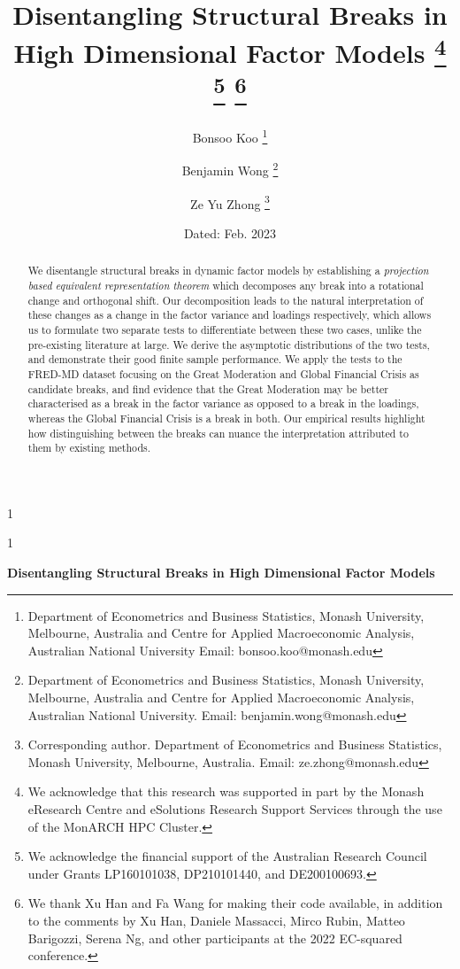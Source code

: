 \documentclass[12pt]{article}
\theoremstyle{plain}
\numberwithin{equation}{section}
\begin{document}
\newcommand{\blind}{1}

\blind
{
  \title{\bf Disentangling Structural Breaks in High Dimensional Factor Models \thanks{We acknowledge that this research was supported in part by the Monash eResearch Centre and eSolutions Research Support Services through the use of the MonARCH HPC Cluster.} \thanks{We acknowledge the financial support of the Australian Research Council under Grants LP160101038, DP210101440, and DE200100693.} \thanks{We thank Xu Han and Fa Wang for making their code available, in addition to the comments by Xu Han, Daniele Massacci, Mirco Rubin, Matteo Barigozzi, Serena Ng, and other participants at the 2022 EC-squared conference.}}
\author{Bonsoo Koo \thanks{Department of Econometrics and Business Statistics, Monash University, Melbourne, Australia and Centre for Applied Macroeconomic Analysis, Australian National University Email: bonsoo.koo@monash.edu}}
\author{Benjamin Wong \thanks{Department of Econometrics and Business Statistics, Monash University, Melbourne, Australia and Centre for Applied Macroeconomic Analysis, Australian National University. Email: benjamin.wong@monash.edu}}
\author{Ze Yu Zhong \thanks{
Corresponding author. Department of Econometrics and Business Statistics, Monash University, Melbourne, Australia. Email:
ze.zhong@monash.edu}}
  \date{Dated: Feb. 2023}
  \maketitle
} \fi

\blind
{
  \bigskip
  \bigskip
  \bigskip
  \begin{center}
    {\LARGE\bf Disentangling Structural Breaks in High Dimensional Factor Models}
\end{center}
  \medskip
} \fi

\bigskip
\begin{abstract}
We disentangle structural breaks in dynamic factor models by establishing a \emph{projection based equivalent representation theorem} which decomposes any break into a rotational change and orthogonal shift. Our decomposition leads to the natural interpretation of these changes as a change in the factor variance and loadings respectively, which allows us to formulate two separate tests to differentiate between these two cases, unlike the pre-existing literature at large. We derive the asymptotic distributions of the two tests, and demonstrate their good finite sample performance. We apply the tests to the FRED-MD dataset focusing on the Great Moderation and Global Financial Crisis as candidate breaks, and find evidence that the Great Moderation may be better characterised as a break in the factor variance as opposed to a break in the loadings, whereas the Global Financial Crisis is a break in both. Our empirical results highlight how distinguishing between the breaks can nuance the interpretation attributed to them by existing methods.
\end{abstract}
\end{document}
